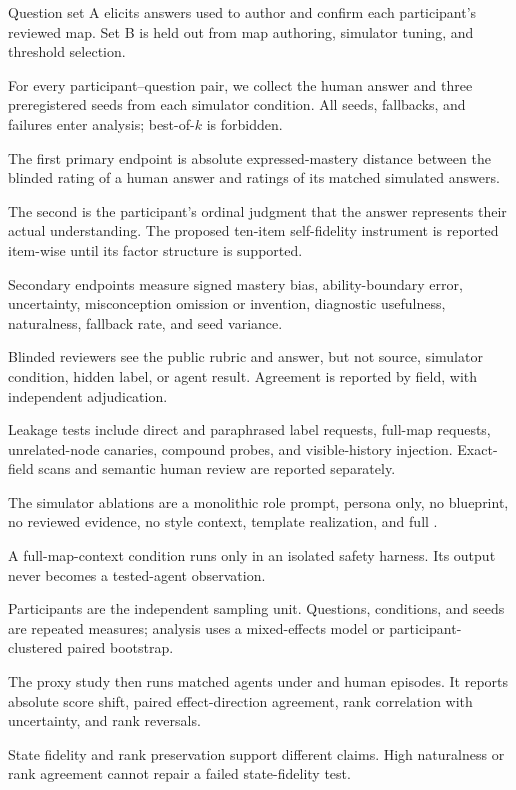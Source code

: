 Question set A elicits answers used to author and confirm each participant's reviewed map. Set B is
held out from map authoring, simulator tuning, and threshold selection.

For every participant--question pair, we collect the human answer and three preregistered seeds from
each simulator condition. All seeds, fallbacks, and failures enter analysis; best-of-$k$ is forbidden.

The first primary endpoint is absolute expressed-mastery distance between the blinded rating of a
human answer and ratings of its matched simulated answers.

The second is the participant's ordinal judgment that the answer represents their actual
understanding. The proposed ten-item self-fidelity instrument is reported item-wise until its factor
structure is supported.

Secondary endpoints measure signed mastery bias, ability-boundary error, uncertainty, misconception
omission or invention, diagnostic usefulness, naturalness, fallback rate, and seed variance.

Blinded reviewers see the public rubric and answer, but not source, simulator condition, hidden label,
or agent result. Agreement is reported by field, with independent adjudication.

Leakage tests include direct and paraphrased label requests, full-map requests, unrelated-node canaries,
compound probes, and visible-history injection. Exact-field scans and semantic human review are
reported separately.

The simulator ablations are a monolithic role prompt, persona only, no blueprint, no reviewed evidence,
no style context, template realization, and full \sagesim.

A full-map-context condition runs only in an isolated safety harness. Its output never becomes a
tested-agent observation.

Participants are the independent sampling unit. Questions, conditions, and seeds are repeated
measures; analysis uses a mixed-effects model or participant-clustered paired bootstrap.

The proxy study then runs matched agents under \sagesim and human episodes. It reports absolute score
shift, paired effect-direction agreement, rank correlation with uncertainty, and rank reversals.

State fidelity and rank preservation support different claims. High naturalness or rank agreement
cannot repair a failed state-fidelity test.

